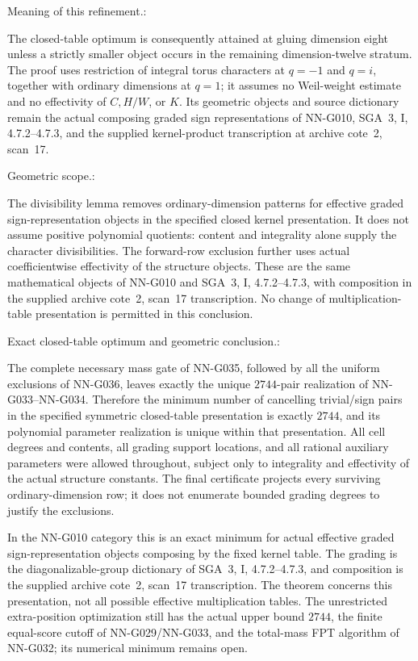 \begin{geometricstatement}[NN-G036]

Meaning of this refinement.:

The closed-table optimum is consequently attained at
gluing dimension eight unless a strictly smaller object
occurs in the remaining dimension-twelve stratum.
The proof uses restriction of integral torus characters
at $q=-1$ and $q=i$, together with ordinary dimensions
at $q=1$; it assumes no Weil-weight estimate and no
effectivity of $C,H/W$, or $K$.
Its geometric objects and source dictionary remain the
actual composing graded sign representations of NN-G010,
SGA~3, I, 4.7.2--4.7.3, and the supplied kernel-product
transcription at archive cote~2, scan~17.


Geometric scope.:

The divisibility lemma removes ordinary-dimension
patterns for effective graded sign-representation
objects in the specified closed kernel presentation.
It does not assume positive polynomial quotients:
content and integrality alone supply the character
divisibilities. The forward-row exclusion further
uses actual coefficientwise effectivity of the
structure objects. These are the same mathematical
objects of NN-G010 and SGA~3, I, 4.7.2--4.7.3,
with composition in the supplied archive
cote~2, scan~17 transcription. No change of
multiplication-table presentation is permitted
in this conclusion.


Exact closed-table optimum and geometric conclusion.:

The complete necessary mass gate of NN-G035,
followed by all the uniform exclusions of NN-G036,
leaves exactly the unique $2744$-pair realization
of NN-G033--NN-G034. Therefore the minimum number
of cancelling trivial/sign pairs in the specified
symmetric closed-table presentation is exactly
$2744$, and its polynomial parameter realization
is unique within that presentation.
All cell degrees and contents, all grading support
locations, and all rational auxiliary parameters
were allowed throughout, subject only to integrality
and effectivity of the actual structure constants.
The final certificate projects every surviving
ordinary-dimension row; it does not enumerate
bounded grading degrees to justify the exclusions.

In the NN-G010 category this is an exact minimum
for actual effective graded sign-representation
objects composing by the fixed kernel table.
The grading is the diagonalizable-group dictionary
of SGA~3, I, 4.7.2--4.7.3, and composition is
the supplied archive cote~2, scan~17 transcription.
The theorem concerns this presentation, not all
possible effective multiplication tables.
The unrestricted extra-position optimization still
has the actual upper bound $2744$, the finite
equal-score cutoff of NN-G029/NN-G033, and the
total-mass FPT algorithm of NN-G032; its numerical
minimum remains open.



\end{geometricstatement}
